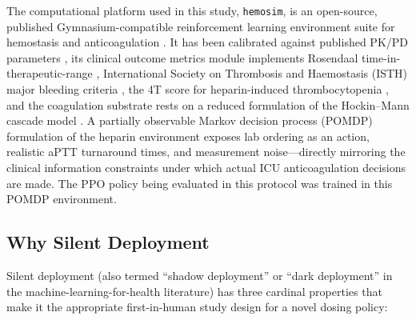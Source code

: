 \documentclass[11pt]{article}
\begin{document}
The computational platform used in this study, \texttt{hemosim}, is an open-source, published Gymnasium-compatible reinforcement learning environment suite for hemostasis and anticoagulation \citep{hemosim2026}. It has been calibrated against published PK/PD parameters \citep{hamberg2007, mueck2007}, its clinical outcome metrics module implements Rosendaal time-in-therapeutic-range \citep{rosendaal1993}, International Society on Thrombosis and Haemostasis (ISTH) major bleeding criteria \citep{schulman2005}, the 4T score for heparin-induced thrombocytopenia \citep{lo2006}, and the coagulation substrate rests on a reduced formulation of the Hockin--Mann cascade model \citep{hockin2002}. A partially observable Markov decision process (POMDP) formulation of the heparin environment \citep{hemosim2026} exposes lab ordering as an action, realistic aPTT turnaround times, and measurement noise---directly mirroring the clinical information constraints under which actual ICU anticoagulation decisions are made. The PPO policy being evaluated in this protocol was trained in this POMDP environment.

\subsection{Why Silent Deployment}

Silent deployment (also termed ``shadow deployment'' or ``dark deployment'' in the machine-learning-for-health literature) has three cardinal properties that make it the appropriate first-in-human study design for a novel dosing policy:
\end{document}

